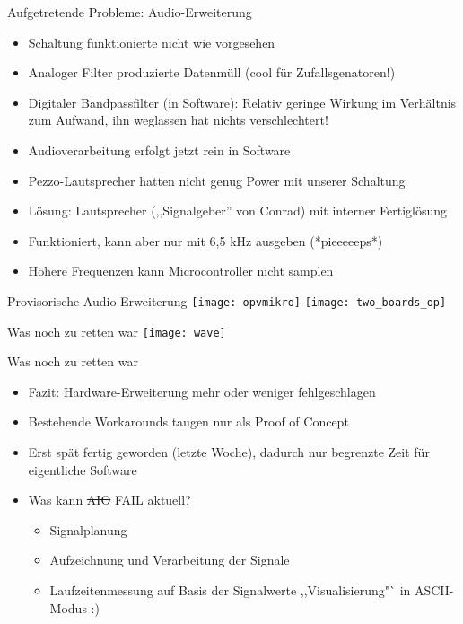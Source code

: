 \documentclass[fleqn,11pt]{beamer}
\begin{document}
\begin{frame}{Aufgetretende Probleme: Audio-Erweiterung}
	\begin{itemize}
	  \item  Schaltung funktionierte nicht wie vorgesehen
	  \item   Analoger Filter produzierte Datenmüll (cool für
	       Zufallsgenatoren!)
	     \item   Digitaler Bandpassfilter (in Software): Relativ
		  geringe Wirkung im
		     Verhältnis zum Aufwand, ihn weglassen hat nichts
		     verschlechtert!
		   \item	        Audioverarbeitung erfolgt jetzt rein in Software
		   \item   Pezzo-Lautsprecher hatten nicht genug Power
			   mit unserer Schaltung
			 \item 	      Lösung: Lautsprecher
			   (,,Signalgeber'' von Conrad) mit interner Fertiglösung
			 \item  Funktioniert, kann aber nur mit
				 6,5 kHz ausgeben (*pieeeeeps*)
			       \item	    Höhere Frequenzen kann  Microcontroller nicht samplen

	\end{itemize}
\end{frame}

\begin{frame}{Provisorische Audio-Erweiterung}
	\texttt{[image: opvmikro]}
	\texttt{[image: two\_boards\_op]}
      \end{frame}

      \begin{frame}{Was noch zu retten war}
	\texttt{[image: wave]}
      \end{frame}


      \begin{frame}{Was noch zu retten war}
	\begin{itemize}
	  \item	    Fazit: Hardware-Erweiterung mehr oder weniger fehlgeschlagen
	  \item Bestehende Workarounds taugen nur als Proof of Concept
	  \item   Erst spät fertig geworden (letzte Woche), dadurch nur
	           begrenzte  Zeit für eigentliche Software
		 \item Was kann \sout{AIO} FAIL aktuell?
		   \begin{itemize}
		     \item 	       Signalplanung
	          \item  Aufzeichnung und Verarbeitung der Signale
		  \item   Laufzeitenmessung auf Basis der Signalwerte
		        ,,Visualisierung"` in ASCII-Modus :)

	\end{itemize}
	\end{itemize}
      \end{frame}
\end{document}
